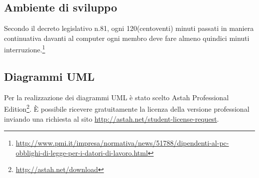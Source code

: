 \subsection{Ambiente di sviluppo}
Secondo il decreto legislativo n.81, ogni 120(centoventi) minuti passati in maniera continuativa davanti al computer ogni membro deve fare almeno quindici minuti interruzione.\footnote{\url{http://www.pmi.it/impresa/normativa/news/51788/dipendenti-al-pc-obblighi-di-legge-per-i-datori-di-lavoro.html}}

\subsection{Diagrammi UML}

Per la realizzazione dei diagrammi \gls{UML} è stato scelto \gls{Astah} Professional Edition\footnote{\url{http://astah.net/download}}.
È possibile ricevere gratuitamente la licenza della versione professional inviando una richiesta al sito \url{http://astah.net/student-license-request}.


